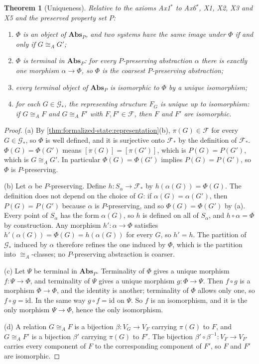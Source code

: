 \documentclass[11pt,letterpaper]{article}
\newtheorem{theorem}{Theorem}[section]
\theoremstyle{definition}
\theoremstyle{remark}
\begin{document}
\begin{theorem}[Uniqueness]
\label{thm:formalized-state:uniqueness}
Relative to the axioms Ax1$^{*}$ to Ax6$^{*}$, X1, X2, X3 and X5 and the preserved property set $P$:
\begin{enumerate}[label=(\alph*)]
\item $\Phi$ is an object of $\mathbf{Abs}_P$, and two systems have the same image under $\Phi$ if and only if $G\cong_AG'$;
\item $\Phi$ is terminal in $\mathbf{Abs}_P$: for every $P$-preserving abstraction $\alpha$ there is exactly one morphism $\alpha\to\Phi$, so $\Phi$ is the coarsest $P$-preserving abstraction;
\item every terminal object of $\mathbf{Abs}_P$ is isomorphic to $\Phi$ by a unique isomorphism;
\item for each $G\in\mathcal{G}_*$, the representing structure $F_G$ is unique up to isomorphism: if $G\cong_AF$ and $G\cong_AF'$ with $F,F'\in\mathcal{F}$, then $F$ and $F'$ are isomorphic.
\end{enumerate}
\end{theorem}

\begin{proof}
(a) By \cref{thm:formalized-state:representation}(b), $\pi(G)\in\mathcal{F}$ for every $G\in\mathcal{G}_*$, so $\Phi$ is well defined, and it is surjective onto $\mathcal{F}_*$ by the definition of $\mathcal{F}_*$. $\Phi(G)=\Phi(G')$ means $[\pi(G)]=[\pi(G')]$, which is $P(G)=P(G')$, which is $G\cong_AG'$. In particular $\Phi(G)=\Phi(G')$ implies $P(G)=P(G')$, so $\Phi$ is $P$-preserving.

(b) Let $\alpha$ be $P$-preserving. Define $h:S_\alpha\to\mathcal{F}_*$ by $h(\alpha(G))=\Phi(G)$. The definition does not depend on the choice of $G$: if $\alpha(G)=\alpha(G')$, then $P(G)=P(G')$ because $\alpha$ is $P$-preserving, and so $\Phi(G)=\Phi(G')$ by (a). Every point of $S_\alpha$ has the form $\alpha(G)$, so $h$ is defined on all of $S_\alpha$, and $h\circ\alpha=\Phi$ by construction. Any morphism $h':\alpha\to\Phi$ satisfies $h'(\alpha(G))=\Phi(G)=h(\alpha(G))$ for every $G$, so $h'=h$. The partition of $\mathcal{G}_*$ induced by $\alpha$ therefore refines the one induced by $\Phi$, which is the partition into $\cong_A$-classes; no $P$-preserving abstraction is coarser.

(c) Let $\Psi$ be terminal in $\mathbf{Abs}_P$. Terminality of $\Phi$ gives a unique morphism $f:\Psi\to\Phi$, and terminality of $\Psi$ gives a unique morphism $g:\Phi\to\Psi$. Then $f\circ g$ is a morphism $\Phi\to\Phi$, and the identity is another; terminality of $\Phi$ allows only one, so $f\circ g=\mathrm{id}$. In the same way $g\circ f=\mathrm{id}$ on $\Psi$. So $f$ is an isomorphism, and it is the only morphism $\Psi\to\Phi$, hence the only isomorphism.

(d) A relation $G\cong_AF$ is a bijection $\beta:V_G\to V_F$ carrying $\pi(G)$ to $F$, and $G\cong_AF'$ is a bijection $\beta'$ carrying $\pi(G)$ to $F'$. The bijection $\beta'\circ\beta^{-1}:V_F\to V_{F'}$ carries every component of $F$ to the corresponding component of $F'$, so $F$ and $F'$ are isomorphic.
\end{proof}
\end{document}
